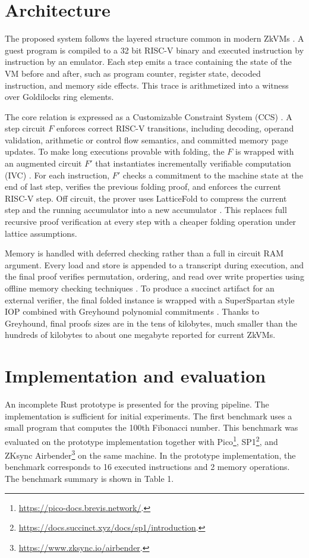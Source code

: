 \documentclass[10pt,a4paper]{article}
\begin{document}
\section*{Architecture}

The proposed system follows the layered structure common in modern ZkVMs
\cite{sokzkvms}. A guest program is compiled to a 32 bit RISC-V binary and
executed instruction by instruction by an emulator. Each step emits a
trace containing the state of the VM before and after, such as program counter,
register state, decoded instruction, and memory side effects.
This trace is arithmetized into a witness over Goldilocks ring elements.

The core relation is expressed as a Customizable Constraint System (CCS)
\cite{ccs}. A step circuit $F$ enforces correct RISC-V transitions, including
decoding, operand validation, arithmetic or control flow semantics, and
committed memory page updates. To make long executions provable with folding,
the $F$ is wrapped with an augmented circuit $F'$ that instantiates incrementally
verifiable computation (IVC) \cite{valiantivc,nova,hypernova}. For each instruction,
$F'$ checks a commitment to the machine state at the end of last step,
verifies the previous folding proof, and enforces the current RISC-V step. Off
circuit, the prover uses LatticeFold to compress the current step and the
running accumulator into a new accumulator \cite{latticefold}. This replaces
full recursive proof verification at every step with a cheaper folding
operation under lattice assumptions.

Memory is handled with deferred checking rather than a full in circuit RAM
argument. Every load and store is appended to a transcript during execution,
and the final proof verifies permutation, ordering, and read over write
properties using offline memory checking techniques \cite{memorycheck}. To
produce a succinct artifact for an external verifier, the final folded
instance is wrapped with a SuperSpartan style IOP combined with Greyhound
polynomial commitments \cite{spartan,greyhound}. Thanks to Greyhound, final
proofs sizes are in the tens of kilobytes, much smaller than the hundreds of kilobytes
to about one megabyte reported for current ZkVMs.

\section*{Implementation and evaluation}

An incomplete Rust prototype is presented for the proving pipeline.
The implementation is sufficient for initial experiments. The first benchmark
uses a small program that computes the 100th Fibonacci number. This benchmark
was evaluated on the prototype implementation together with Pico\footnote{\url{https://pico-docs.brevis.network/}.},
SP1\footnote{\url{https://docs.succinct.xyz/docs/sp1/introduction}.}, and ZKsync
Airbender\footnote{\url{https://www.zksync.io/airbender}.}
on the same machine. In the prototype implementation, the benchmark
corresponds to 16 executed instructions and 2 memory operations. The benchmark
summary is shown in Table 1.
\end{document}
